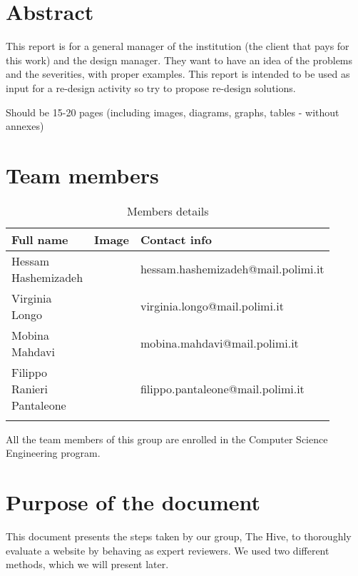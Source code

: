 \section{Abstract}
This report is for a general manager of the institution (the client that pays for this work) and the design manager. They want to have an idea of the problems and the severities, with proper examples.
This report is intended to be used as input for a re-design activity so try to propose re-design solutions.

Should be 15-20 pages (including images, diagrams, graphs, tables - without annexes)


\section{Team members}
\begin{longtable}
    {|m{0.3\linewidth}|m{0.2\linewidth}|m{0.4\linewidth}|}
            \hline
            \textbf{Full name} & \textbf{Image} & \textbf{Contact info}\\
            \hline
            \endhead
                Hessam Hashemizadeh &
                \centering
                & hessam.hashemizadeh@mail.polimi.it \\
            \hline
                Virginia Longo  &
                \centering
                & virginia.longo@mail.polimi.it \\
            \hline
                Mobina Mahdavi &
                \centering
                & mobina.mahdavi@mail.polimi.it \\
            \hline
                Filippo Ranieri Pantaleone &
                \centering
                & filippo.pantaleone@mail.polimi.it \\
            \hline
            \caption{Members details}
            \label{table:mem_details}
\end{longtable}

All the team members of this group are enrolled in the Computer Science Engineering program.

\section{Purpose of the document}
This document presents the steps taken by our group, The Hive, to thoroughly evaluate a website by behaving as expert reviewers. We used two different methods, which we will present later.


